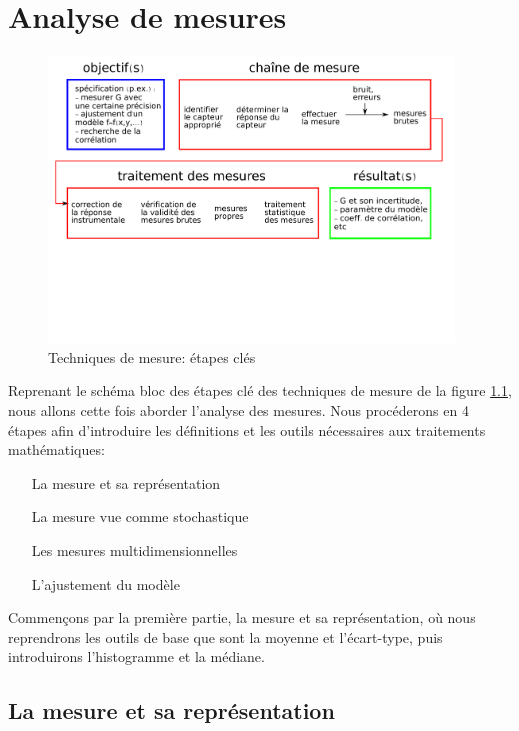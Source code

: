 \documentclass[main.tex]{subfiles}
\begin{document}
\chapter{Analyse de mesures}
\label{chap:measurements}

\iftrue


\begin{figure}[h]
   \centering
   \includegraphics[width=0.96\textwidth]{assets/figures/flowChartTechMes.pdf} 
   \caption{Techniques de mesure: étapes clés}
   \label{fig:flowChartTechMes_chaine_de_mesure_ch4}
\end{figure}

Reprenant le schéma bloc des étapes clé des techniques de mesure de la figure \ref{fig:flowChartTechMes_chaine_de_mesure_ch4}, nous allons cette fois aborder l'analyse des mesures. Nous procéderons en 4 étapes afin d'introduire les définitions et les outils nécessaires aux traitements mathématiques:

\begin{itemize}
\item[La mesure et sa représentation]
\item[La mesure vue comme stochastique]
\item[Les mesures multidimensionnelles]
\item[L'ajustement du modèle]
\end{itemize}

Commençons par la première partie, la mesure et sa représentation, où nous reprendrons les outils de base que sont la moyenne et l'écart-type, puis introduirons l'histogramme et la médiane.

\section{La mesure et sa représentation}
\end{document}

